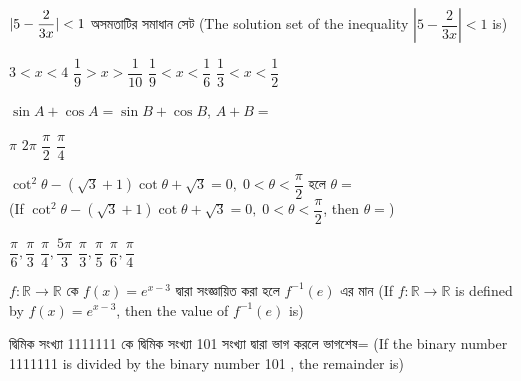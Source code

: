 \documentclass[addpoints]{exam}
\begin{document}
\begin{questions}

 \question $ \mathlarger{|}5-\dfrac{2}{3x}\mathlarger{|}<1 $  অসমতাটির সমাধান সেট (The solution set of the inequality $ |5-\dfrac{2}{3x}|<1 $ is)

\begin{oneparchoices}
\choice $ 3<x<4 $
\choice $ \dfrac{1}{9}> x > \dfrac{1}{10} $
\choice $ \dfrac{1}{9}< x < \dfrac{1}{6} $
\choice $ \dfrac{1}{3}< x < \dfrac{1}{2} $

\end{oneparchoices}

\question  $ \sin A + \cos A = \sin B + \cos B $, $ A+B =  $

\begin{oneparchoices}
\choice $ \pi $
\choice $ 2\pi $
\choice $ \dfrac{\pi}{2} $
\choice  $ \dfrac{\pi}{4} $

\end{oneparchoices}

\question  $ \cot^{2}\theta -(\sqrt{3}+1)\cot \theta +\sqrt{3} =0,\; 0<\theta <\dfrac{\pi}{2} $ হলে $ \theta = $\\ (If $ \cot^{2}\theta -(\sqrt{3}+1)\cot \theta +\sqrt{3} =0,\; 0<\theta <\dfrac{\pi}{2} $, then $ \theta = $)

\begin{oneparchoices}
\choice $ \dfrac{\pi}{6}, \dfrac{\pi}{3} $
\choice $ \dfrac{\pi}{4}, \dfrac{5\pi}{3} $
\choice $ \dfrac{\pi}{3}, \dfrac{\pi}{5} $
\choice $ \dfrac{\pi}{6}, \dfrac{\pi}{4} $

\end{oneparchoices}

\question  $ f:\mathbb{R}\to\mathbb{R} $ কে $ f(x) = e^{x-3} $ দ্বারা সংজ্ঞায়িত করা হলে $ f^{-1}(e) $ এর মান (If $ f:\mathbb{R}\to\mathbb{R} $ is defined by $ f(x) = e^{x-3} $, then the value of $ f^{-1}(e) $ is)

\begin{oneparchoices}

\end{oneparchoices}


\question  দ্বিমিক সংখ্যা 1111111 কে দ্বিমিক সংখ্যা 101 সংখ্যা দ্বারা ভাগ করলে ভাগশেষ= (If the binary number 1111111 is divided by the binary number 101 , the remainder is)

\begin{oneparchoices}

\end{oneparchoices}


\end{questions}
\end{document}
